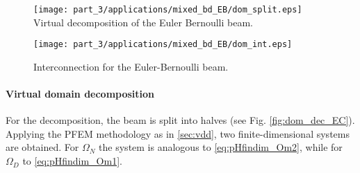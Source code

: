\begin{figure}[t]
	\begin{minipage}[b]{0.4\linewidth}
		\centering
		\texttt{[image: part\_3/applications/mixed\_bd\_EB/dom\_split.eps]} \\
		\caption{Virtual decomposition of the Euler Bernoulli beam.}
		\label{fig:dom_dec_EC}
	\end{minipage}
	\hspace{0.5cm}
	\begin{minipage}[b]{0.5\linewidth}
		\centering
		\texttt{[image: part\_3/applications/mixed\_bd\_EB/dom\_int.eps]}
		\caption{Interconnection for the Euler-Bernoulli beam.}
		\label{fig:dom_int_EB}
	\end{minipage}
\end{figure}


\paragraph{Virtual domain decomposition}
For the decomposition, the beam is split into halves (see Fig. \ref{fig:dom_dec_EC}).
Applying the PFEM methodology as in \ref{sec:vdd}, two finite-dimensional systems are obtained. For $\Omega_N$ the system is analogous to \eqref{eq:pHfindim_Om2}, while for $\Omega_D$ to \eqref{eq:pHfindim_Om1}.

